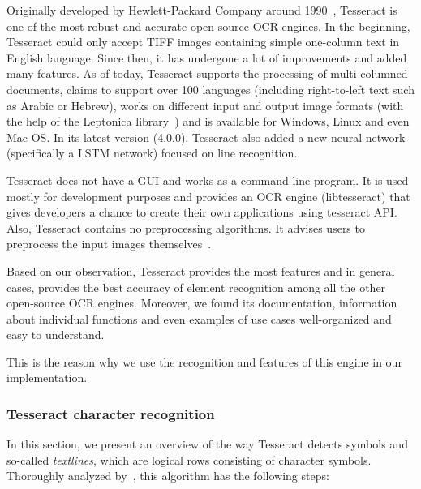 Originally developed by Hewlett-Packard Company around 1990~\citep{TesseractGIT}, Tesseract is one of the most robust and accurate open-source OCR engines. In the beginning, Tesseract could only accept TIFF images containing simple one-column text in English language. Since then, it has undergone a lot of improvements and added many features. As of today, Tesseract supports the processing of multi-columned documents, claims to support over 100 languages (including right-to-left text such as Arabic or Hebrew), works on different input and output image formats (with the help of the Leptonica library~\citep{LeptonicaLIB}) and is available for Windows, Linux and even Mac OS. In its latest version (4.0.0), Tesseract also added a new neural network (specifically a LSTM network) focused on line recognition. 

Tesseract does not have a GUI and works as a command line program. It is used mostly for development purposes and provides an OCR engine (libtesseract) that gives developers a chance to create their own applications using tesseract API. Also, Tesseract contains no preprocessing algorithms. It advises users to preprocess the input images themselves~\citep{TesseractQual}.

Based on our observation, Tesseract provides the most features and in general cases, provides the best accuracy of element recognition among all the other open-source OCR engines. Moreover, we found its documentation, information about individual functions and even examples of use cases well-organized and easy to understand.

This is the reason why we use the recognition and features of this engine in our implementation.

\subsubsection{Tesseract character recognition} \label{tesseractCharacterRecognition}

In this section, we present an overview of the way Tesseract detects symbols and so-called \emph{textlines}, which are logical rows consisting of character symbols. Thoroughly analyzed by~\citet{smith2007overview}, this algorithm has the following steps:

